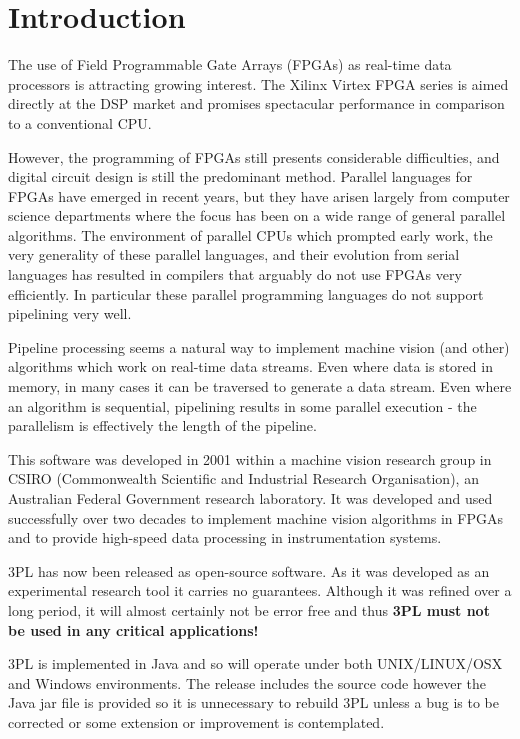 

\chapter{Introduction}

    The use of Field Programmable Gate Arrays (FPGAs) as real-time data
    processors is attracting growing interest. The
    Xilinx Virtex FPGA series is aimed directly at the DSP market
    and promises spectacular performance in comparison to a conventional
    CPU.

    However, the programming of FPGAs still presents considerable
    difficulties, and digital circuit design is still the predominant
    method. Parallel languages for FPGAs have emerged in recent years, but
    they have arisen largely from computer science departments where the
    focus has been on a wide range of general parallel algorithms. The
    environment of parallel CPUs which prompted early work, the very
    generality of these parallel languages, and their evolution from serial
    languages has resulted in compilers that arguably do not use FPGAs very
    efficiently. In particular these parallel programming languages do
    not support pipelining very well.

    Pipeline processing seems a natural way to implement machine vision
    (and other) algorithms which work on real-time data streams. Even
    where data is stored in memory, in many cases it can be traversed
    to generate a data stream. Even where an algorithm is sequential,
    pipelining results in some parallel execution - the parallelism
    is effectively the length of the pipeline.

    This software was developed in 2001 within a machine vision research
    group in CSIRO (Commonwealth Scientific and Industrial Research
    Organisation), an Australian Federal Government research laboratory.
    It was developed and used successfully over two decades to implement
    machine vision algorithms in FPGAs and to provide high-speed data
    processing in instrumentation systems.

    3PL has now been released as open-source software. As it was developed as
    an experimental research tool it carries no guarantees. Although it was
    refined over a long period, it will almost certainly not be error free and
    thus {\bf 3PL must not be used in any critical applications!}

    3PL is implemented in Java and so will operate under both UNIX/LINUX/OSX
    and Windows environments. The release includes the source code however
    the Java jar file is provided so it is unnecessary to rebuild 3PL unless
    a bug is to be corrected or some extension or improvement is contemplated.

